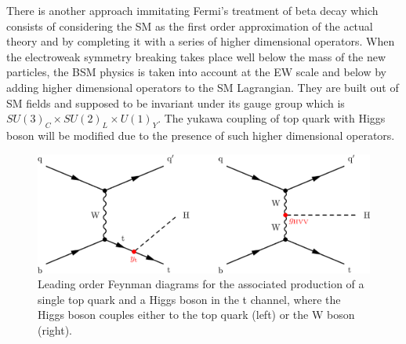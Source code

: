 \documentclass[final,3p]{CSP}
\begin{document}
There is another approach immitating 
Fermi's treatment of beta decay 
which consists of considering the SM as the first order approximation of the actual theory 
and by completing it with a series 
of higher dimensional operators. When the electroweak symmetry breaking takes place well 
below the mass of the new particles, 
the BSM physics is taken into account at the EW scale and below by adding higher dimensional 
operators to the SM Lagrangian. 
They are built out of SM fields and supposed to be invariant under its gauge group which is $SU(3)_C \times SU(2)_L \times U(1)_Y$.
The yukawa coupling of top quark with Higgs boson will be modified due to the presence of such higher dimensional operators.

\begin{figure}[ht]
	\centering
	\includegraphics[width=\columnwidth]{./cms.png}
	\caption{Leading order Feynman diagrams for the associated production of a single top quark and a Higgs boson in the t channel, where the Higgs boson couples either to the top quark (left) or the W boson (right).}
	\label{figure 4}
\end{figure}
\end{document}
